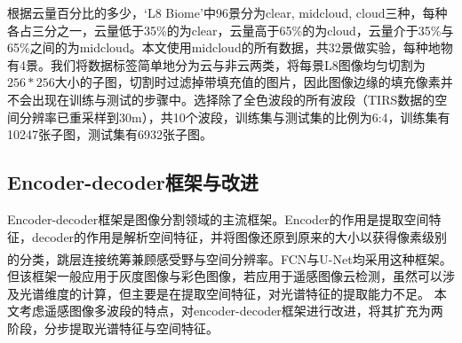 \documentclass[10pt]{ctexart}
\newcommand{\upcite}[1]{\textsuperscript{\textsuperscript{\cite{#1}}}}
\begin{document}
\begin{multicols}{2}
\begin{table}[H]
    \centering
    
    \label{BiomeFlag}
    \end{table}

根据云量百分比的多少，‘L8 Biome’中96景分为clear, midcloud, cloud三种，每种各占三分之一，云量低于35\%的为clear，云量高于65\%的为cloud，云量介于35\%与65\%之间的为midcloud。本文使用midcloud的所有数据，共32景做实验，每种地物有4景。我们将数据标签简单地分为云与非云两类，将每景L8图像均匀切割为$256*256$大小的子图，切割时过滤掉带填充值的图片，因此图像边缘的填充像素并不会出现在训练与测试的步骤中。选择除了全色波段的所有波段（TIRS数据的空间分辨率已重采样到30m），共10个波段，训练集与测试集的比例为6:4，训练集有10247张子图，测试集有6932张子图。

\subsection{Encoder-decoder框架与改进}
Encoder-decoder框架是图像分割领域的主流框架。Encoder的作用是提取空间特征，decoder的作用是解析空间特征，并将图像还原到原来的大小以获得像素级别的分类，跳层连接统筹兼顾感受野与空间分辨率。FCN\upcite{FCN}与U-Net\upcite{ronneberger2015unet}均采用这种框架。但该框架一般应用于灰度图像与彩色图像，若应用于遥感图像云检测，虽然可以涉及光谱维度的计算，但主要是在提取空间特征，对光谱特征的提取能力不足。
本文考虑遥感图像多波段的特点，对encoder-decoder框架进行改进，将其扩充为两阶段，分步提取光谱特征与空间特征。


\end{multicols}
\end{document}
